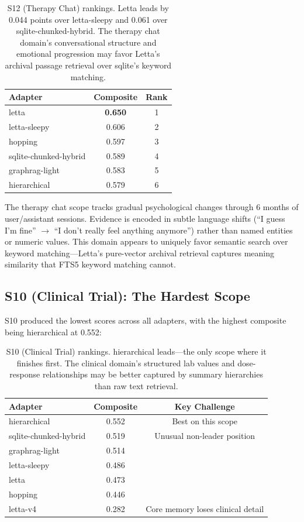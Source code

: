 \documentclass[11pt,letterpaper]{article}
\begin{document}
\begin{table}[H]
\centering
\small
\begin{tabular}{lcc}
\toprule
\textbf{Adapter} & \textbf{Composite} & \textbf{Rank} \\
\midrule
\rowcolor{toprow}
letta & \textbf{0.650} & 1 \\
letta-sleepy & 0.606 & 2 \\
hopping & 0.597 & 3 \\
sqlite-chunked-hybrid & 0.589 & 4 \\
graphrag-light & 0.583 & 5 \\
hierarchical & 0.579 & 6 \\
\bottomrule
\end{tabular}
\caption{S12 (Therapy Chat) rankings. Letta leads by 0.044 points over letta-sleepy and 0.061 over sqlite-chunked-hybrid. The therapy chat domain's conversational structure and emotional progression may favor Letta's archival passage retrieval over sqlite's keyword matching.}
\label{tab:s12-rankings}
\end{table}

The therapy chat scope tracks gradual psychological changes through 6 months of user/assistant sessions. Evidence is encoded in subtle language shifts (``I guess I'm fine'' $\to$ ``I don't really feel anything anymore'') rather than named entities or numeric values. This domain appears to uniquely favor semantic search over keyword matching---Letta's pure-vector archival retrieval captures meaning similarity that FTS5 keyword matching cannot.

\subsection{S10 (Clinical Trial): The Hardest Scope}

S10 produced the lowest scores across all adapters, with the highest composite being hierarchical at 0.552:

\begin{table}[H]
\centering
\small
\begin{tabular}{lcc}
\toprule
\textbf{Adapter} & \textbf{Composite} & \textbf{Key Challenge} \\
\midrule
hierarchical & 0.552 & Best on this scope \\
sqlite-chunked-hybrid & 0.519 & Unusual non-leader position \\
graphrag-light & 0.514 & \\
letta-sleepy & 0.486 & \\
letta & 0.473 & \\
hopping & 0.446 & \\
letta-v4 & 0.282 & Core memory loses clinical detail \\
\bottomrule
\end{tabular}
\caption{S10 (Clinical Trial) rankings. hierarchical leads---the only scope where it finishes first. The clinical domain's structured lab values and dose-response relationships may be better captured by summary hierarchies than raw text retrieval.}
\label{tab:s10-rankings}
\end{table}
\end{document}
